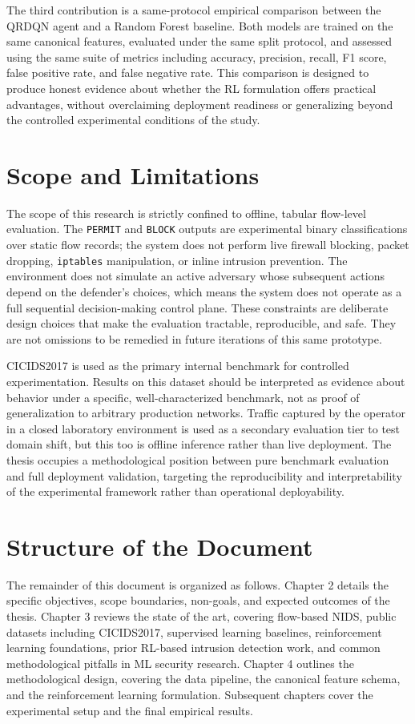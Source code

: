 The third contribution is a same-protocol empirical comparison between the QRDQN agent and a Random Forest baseline. Both models are trained on the same canonical features, evaluated under the same split protocol, and assessed using the same suite of metrics including accuracy, precision, recall, F1 score, false positive rate, and false negative rate. This comparison is designed to produce honest evidence about whether the RL formulation offers practical advantages, without overclaiming deployment readiness or generalizing beyond the controlled experimental conditions of the study.

\section{Scope and Limitations}
The scope of this research is strictly confined to offline, tabular flow-level evaluation. The \texttt{PERMIT} and \texttt{BLOCK} outputs are experimental binary classifications over static flow records; the system does not perform live firewall blocking, packet dropping, \texttt{iptables} manipulation, or inline intrusion prevention. The environment does not simulate an active adversary whose subsequent actions depend on the defender's choices, which means the system does not operate as a full sequential decision-making control plane. These constraints are deliberate design choices that make the evaluation tractable, reproducible, and safe. They are not omissions to be remedied in future iterations of this same prototype.

CICIDS2017 is used as the primary internal benchmark for controlled experimentation. Results on this dataset should be interpreted as evidence about behavior under a specific, well-characterized benchmark, not as proof of generalization to arbitrary production networks. Traffic captured by the operator in a closed laboratory environment is used as a secondary evaluation tier to test domain shift, but this too is offline inference rather than live deployment. The thesis occupies a methodological position between pure benchmark evaluation and full deployment validation, targeting the reproducibility and interpretability of the experimental framework rather than operational deployability.

\section{Structure of the Document}
The remainder of this document is organized as follows. Chapter 2 details the specific objectives, scope boundaries, non-goals, and expected outcomes of the thesis. Chapter 3 reviews the state of the art, covering flow-based NIDS, public datasets including CICIDS2017, supervised learning baselines, reinforcement learning foundations, prior RL-based intrusion detection work, and common methodological pitfalls in ML security research. Chapter 4 outlines the methodological design, covering the data pipeline, the canonical feature schema, and the reinforcement learning formulation. Subsequent chapters cover the experimental setup and the final empirical results.
